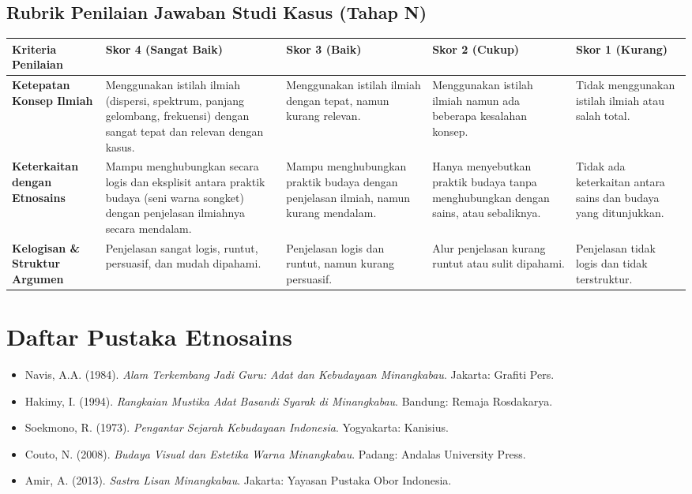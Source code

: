 \documentclass[12pt,a4paper]{article}
\begin{document}
\subsection{Rubrik Penilaian Jawaban Studi Kasus (Tahap N)}

\begin{center}
\begin{tabular}{|p{3cm}|p{3cm}|p{3cm}|p{3cm}|p{3cm}|}
\hline
\textbf{Kriteria Penilaian} & \textbf{Skor 4 (Sangat Baik)} & \textbf{Skor 3 (Baik)} & \textbf{Skor 2 (Cukup)} & \textbf{Skor 1 (Kurang)} \\
\hline
\textbf{Ketepatan Konsep Ilmiah} & Menggunakan istilah ilmiah (dispersi, spektrum, panjang gelombang, frekuensi) dengan sangat tepat dan relevan dengan kasus. & Menggunakan istilah ilmiah dengan tepat, namun kurang relevan. & Menggunakan istilah ilmiah namun ada beberapa kesalahan konsep. & Tidak menggunakan istilah ilmiah atau salah total. \\
\hline
\textbf{Keterkaitan dengan Etnosains} & Mampu menghubungkan secara logis dan eksplisit antara praktik budaya (seni warna songket) dengan penjelasan ilmiahnya secara mendalam. & Mampu menghubungkan praktik budaya dengan penjelasan ilmiah, namun kurang mendalam. & Hanya menyebutkan praktik budaya tanpa menghubungkan dengan sains, atau sebaliknya. & Tidak ada keterkaitan antara sains dan budaya yang ditunjukkan. \\
\hline
\textbf{Kelogisan \& Struktur Argumen} & Penjelasan sangat logis, runtut, persuasif, dan mudah dipahami. & Penjelasan logis dan runtut, namun kurang persuasif. & Alur penjelasan kurang runtut atau sulit dipahami. & Penjelasan tidak logis dan tidak terstruktur. \\
\hline
\end{tabular}
\end{center}

\vspace{1cm}

\section{Daftar Pustaka Etnosains}
\begin{itemize}
\item Navis, A.A. (1984). \textit{Alam Terkembang Jadi Guru: Adat dan Kebudayaan Minangkabau}. Jakarta: Grafiti Pers.
\item Hakimy, I. (1994). \textit{Rangkaian Mustika Adat Basandi Syarak di Minangkabau}. Bandung: Remaja Rosdakarya.
\item Soekmono, R. (1973). \textit{Pengantar Sejarah Kebudayaan Indonesia}. Yogyakarta: Kanisius.
\item Couto, N. (2008). \textit{Budaya Visual dan Estetika Warna Minangkabau}. Padang: Andalas University Press.
\item Amir, A. (2013). \textit{Sastra Lisan Minangkabau}. Jakarta: Yayasan Pustaka Obor Indonesia.
\end{itemize}
\end{document}
